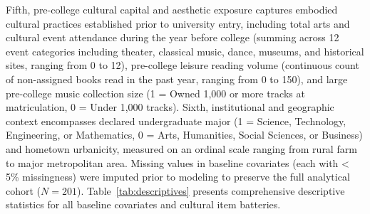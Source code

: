 \documentclass[12pt]{article}
\begin{document}
Fifth, pre-college cultural capital and aesthetic exposure captures embodied cultural practices established prior to university entry, including total arts and cultural event attendance during the year before college (summing across 12 event categories including theater, classical music, dance, museums, and historical sites, ranging from 0 to 12), pre-college leisure reading volume (continuous count of non-assigned books read in the past year, ranging from 0 to 150), and large pre-college music collection size (1 = Owned 1,000 or more tracks at matriculation, 0 = Under 1,000 tracks). Sixth, institutional and geographic context encompasses declared undergraduate major (1 = Science, Technology, Engineering, or Mathematics, 0 = Arts, Humanities, Social Sciences, or Business) and hometown urbanicity, measured on an ordinal scale ranging from rural farm to major metropolitan area. Missing values in baseline covariates (each with < 5\% missingness) were imputed prior to modeling to preserve the full analytical cohort ($N = 201$). Table~\ref{tab:descriptives} presents comprehensive descriptive statistics for all baseline covariates and cultural item batteries.
\end{document}
